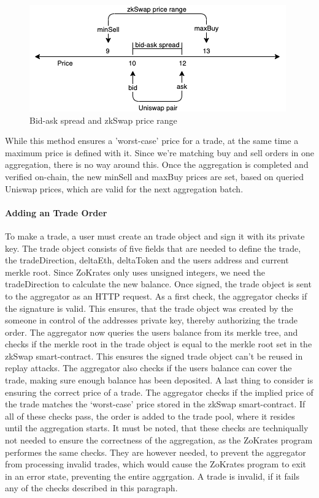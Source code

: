 \documentclass[../../thesis.tex]{subfiles}
\begin{document}
\begin{figure}[h]
    \centerline{\includegraphics[totalheight=3cm]{diagrams/priceing.png}}
    \caption{Bid-ask spread and zkSwap price range}
    \label{fig:price}
\end{figure}

While this method ensures a 'worst-case' price for a trade, at the same time a maximum price is defined with it. Since we're matching buy and sell orders in one aggregation, there is no way around this. Once the aggregation is completed and verified on-chain, the new minSell and maxBuy prices are set, based on queried Uniswap prices, which are valid for the next aggregation batch.

\paragraph{Adding an Trade Order}
To make a trade, a user must create an trade object and sign it with its private key. The trade object consists of five fields that are needed to define the trade, the tradeDirection, deltaEth, deltaToken and the users address and current merkle root. Since ZoKrates only uses unsigned integers, we need the tradeDirection to calculate the new balance. Once signed, the trade object is sent to the aggregator as an HTTP request. As a first check, the aggregator checks if the signature is valid. This ensures, that the trade object was created by the someone in control of the addresses private key, thereby authorizing the trade order. The aggregator now queries the users balance from its merkle tree, and checks if the merkle root in the trade object is equal to the merkle root set in the zkSwap smart-contract. This ensures the signed trade object can't be reused in replay attacks. The aggregator also checks if the users balance can cover the trade, making sure enough balance has been deposited. A last thing to consider is ensuring the correct price of a trade. The aggregator checks if the implied price of the trade matches the ‘worst-case’ price stored in the zkSwap smart-contract. If all of these checks pass, the order is added to the trade pool, where it resides until the aggregation starts. It must be noted, that these checks are techniqually not needed to ensure the correctness of the aggregation, as the ZoKrates program performes the same checks. They are however needed, to prevent the aggregator from processing invalid trades, which would cause the ZoKrates program to exit in an error state, preventing the entire aggrgation. A trade is invalid, if it fails any of the checks described in this paragraph.
\end{document}

